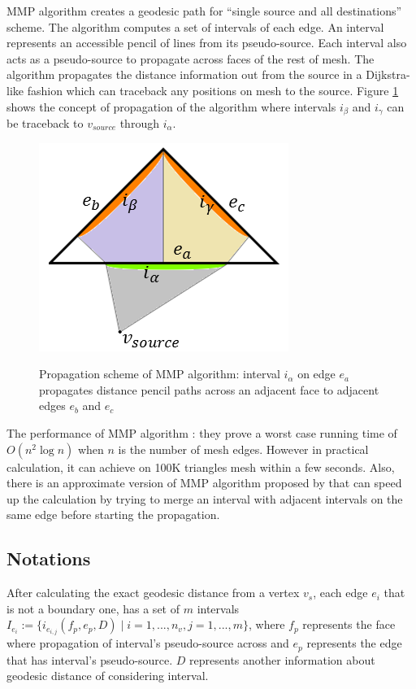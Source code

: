 \documentclass[a4paper,twoside]{article}
\begin{document}
MMP algorithm creates a geodesic path for ``single source and all destinations'' scheme. The algorithm computes a set of intervals of each edge. An interval represents an accessible pencil of lines from its pseudo-source. Each interval also acts as a pseudo-source to propagate across faces of the rest of mesh. The algorithm propagates the distance information out from the source in a Dijkstra-like fashion which can traceback any positions on mesh to the source. Figure \ref{fig:mmp algorithm} shows the concept of propagation of the algorithm where intervals $i_{\beta}$ and $i_{\gamma}$ can be traceback to $v_{source}$ through $i_{\alpha}$.

\begin{figure}[!h]
	\centering
	{\includegraphics[width=0.75\columnwidth]{images/mmp_algorithm.png}}
	\caption{Propagation scheme of MMP algorithm: interval $i_{\alpha}$ on edge $e_a$ propagates distance pencil paths across an adjacent face to adjacent edges $e_b$ and $e_c$ }
	\label{fig:mmp algorithm}
\end{figure}

The performance of MMP algorithm : they prove a worst case
running time of $O(n^2 \log n)$ when $n$ is the number of mesh edges. However in practical calculation, it can achieve on 100K triangles mesh within a few seconds. Also, there is an approximate version of MMP algorithm proposed by \cite{Surazhsky:2005:FEA:1073204.1073228} that can speed up the calculation by trying to merge an interval with adjacent intervals on the same edge before starting the propagation.

\subsection*{Notations}
After calculating the exact geodesic distance from a vertex $v_s$, each edge $e_i$ that is not a boundary one, has a set of $m$ intervals $I_{e_i}:=\{ i_{e_{i,j}}(f_p,e_p,D) \mid i = 1, ... ,n_v , j = 1,...,m\}$, where $f_p$ represents the face where propagation of interval's pseudo-source across and $e_p$ represents the edge that has interval's pseudo-source. $D$ represents another information about geodesic distance of considering interval.
\end{document}
